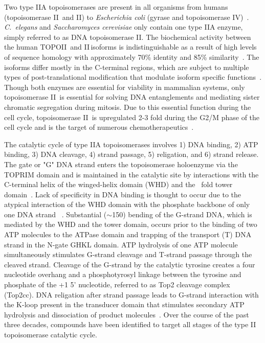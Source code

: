 \documentclass[12pt]{article}
\begin{document}
Two type IIA topoisomerases are present in all organisms from humans (topoisomerase II\textalpha\ and II\textbeta) to {\it Escherichia coli} (gyrase and topoisomerase IV)~\cite{Wang:2002hh}. {\it C.~elegans} and {\it Saccharomyces cerevisiae} only contain one type IIA enzyme, simply referred to as DNA topoisomerase II. The biochemical activity between the human TOPOII\textalpha\ and II\textbeta\,isoforms is indistinguishable as a result of high levels of sequence homology with approximately 70\% identity and 85\% similarity~\cite{Austin:1995ua}. The isoforms differ mostly in the C-terminal regions, which are subject to multiple types of post-translational modification that modulate isoform specific functions~\cite{Linka:2007jo}. Though both enzymes are essential for viability in mammalian systems, only topoisomerase II\textalpha\ is essential for solving DNA entanglements and mediating sister chromatic segregation during mitosis. Due to this essential function during the cell cycle, topoisomerase II\textalpha\ is upregulated 2-3 fold during the G2/M phase of the cell cycle and is the target of numerous chemotherapeutics~\cite{Wu:2013dia}. 

\vspace{5pt}

The catalytic cycle of type IIA topoisomerases involves 1) DNA binding, 2) ATP binding, 3) DNA cleavage, 4) strand passage, 5) religation, and 6) strand release. The gate or "G" DNA strand enters the topoisomerase holoenzyme via the TOPRIM domain and is maintained in the catalytic site by interactions with the C-terminal helix of the winged-helix domain (WHD) and the \textalpha\textbeta\ fold tower domain~\cite{Chang:2013bn,Dong:2007ita}. Lack of specificity in DNA binding is thought to occur due to the atypical interaction of the WHD domain with the phosphate backbone of only one DNA strand ~\cite{Dong:2007ita}. Substantial ($\sim$150\degree) bending of the G-strand DNA, which is mediated by the WHD and the tower domain, occurs prior to the binding of two ATP molecules to the ATPase domain and trapping of the transport (T) DNA strand in the N-gate GHKL domain. ATP hydrolysis of one ATP molecule simultaneously stimulates G-strand cleavage and T-strand passage through the cleaved strand. Cleavage of the G-strand by the catalytic tyrosine creates a four nucleotide overhang and a phosphotyrosyl linkage between the tyrosine and phosphate of the +1 5' nucleotide, referred to as Top2 cleavage complex (Top2cc). DNA religation after strand passage leads to G-strand interaction with the K-loop present in the transducer domain that stimulates secondary ATP hydrolysis and dissociation of product molecules~\cite{Schmidt:2012eu}. Over the course of the past three decades, compounds have been identified to target all stages of the type II topoisomerase catalytic cycle. 
\vspace{-10pt}
\end{document}

